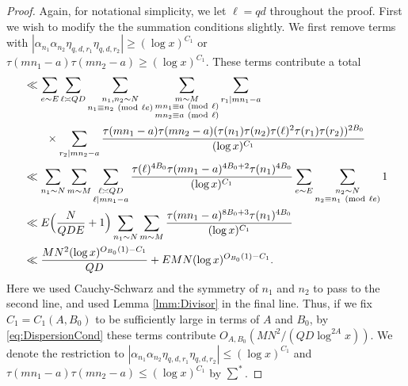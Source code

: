 \documentclass[10pt]{amsart}
\theoremstyle{plain}
\numberwithin{equation}{section}
\newcommand{\Mod}[1]{\ (\mathrm{mod}\ #1)}
\begin{document}
%
%
%
%
\begin{proof}
Again, for notational simplicity, we let $\ell=q d$ throughout the proof. First we wish to modify the the summation conditions slightly. We first remove terms with $|\alpha_{n_1}\alpha_{n_2}\eta_{q,d,r_1}\eta_{q,d,r_2}|\ge (\log{x})^{C_1}$ or $\tau(m n_1-a)\tau(m n_2-a)\ge (\log{x})^{C_1}$. These terms contribute a total
\begin{align*}
&\ll \sum_{e\sim E}\sum_{\ell\asymp Q D}\sum_{\substack{n_1,n_2\sim N\\ n_1\equiv n_2\Mod{\ell e}}}\sum_{\substack{m\sim M\\ m n_1\equiv a\Mod{\ell}\\ m n_2\equiv a\Mod{\ell}}}\sum_{r_1|m n_1-a}\\
&\qquad\times\sum_{r_2|m n_2-a}\frac{\tau(m n_1-a)\tau(m n_2-a)(\tau(n_1)\tau(n_2)\tau(\ell)^{2}\tau(r_1)\tau(r_2))^{2B_0}}{(\log{x})^{C_1} }\\
&\ll \sum_{n_1\sim N}\sum_{\substack{m\sim  M}}\sum_{\substack{\ell\asymp Q D\\ \ell|m n_1-a}}\frac{\tau(\ell)^{4B_0}\tau(m n_1-a)^{4B_0+2}\tau(n_1)^{4B_0}}{(\log{x})^{C_1} }\sum_{e\sim E}\sum_{\substack{n_2\sim N\\ n_2\equiv n_1\Mod{\ell e}}}1\\
&\ll E\Bigl(\frac{N}{Q D E}+1\Bigr)\sum_{n_1\sim N}\sum_{m\sim M}\frac{\tau(m n_1-a)^{8B_0+3}\tau(n_1)^{4B_0}}{(\log{x})^{C_1} }\\
&\ll \frac{MN^2(\log{x})^{O_{B_0}(1)-C_1}}{Q D}+E MN(\log{x})^{O_{B_0}(1)-C_1}.
\end{align*}
Here we used Cauchy-Schwarz and the symmetry of $n_1$ and $n_2$ to pass to the second line, and used Lemma \ref{lmm:Divisor} in the final line. Thus, if we fix $C_1=C_1(A,B_0)$ to be sufficiently large in terms of $A$ and $B_0$, by \eqref{eq:DispersionCond} these terms contribute $O_{A,B_0}(MN^2/(Q D\log^{2A}{x}))$. We denote the restriction to $|\alpha_{n_1}\alpha_{n_2}\eta_{q,d,r_1}\eta_{q,d,r_2}|\le (\log{x})^{C_1}$ and $\tau(m n_1-a)\tau(m n_2-a)\le (\log{x})^{C_1}$ by $\sum^*$.


\end{proof}
\end{document}
